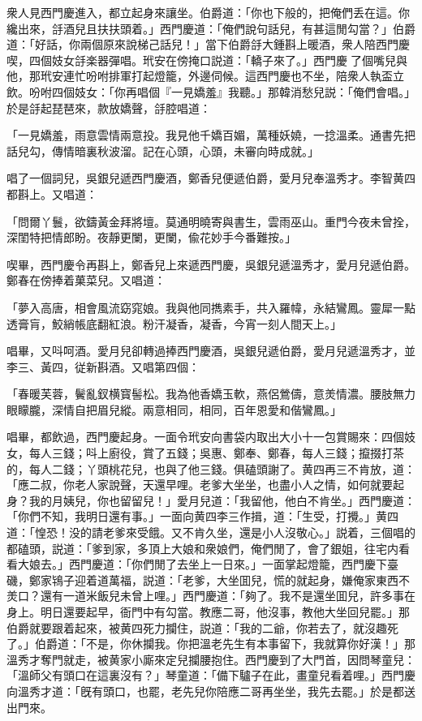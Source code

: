 衆人見西門慶進入，都立起身來讓坐。伯爵道：「你也下般的，把俺們丢在這。你纔出來，㧱酒兒且扶扶頭着。」西門慶道：「俺們說句話兒，有甚這閒勾當？」伯爵道：「好話，你兩個原來說梯己話兒！」當下伯爵㧱大鍾斟上暖酒，衆人陪西門慶喫，四個妓女㧱楽器彈唱。玳安在傍掩口説道：「轎子來了。」西門慶𢫓了個嘴兒與他，那玳安連忙吩咐排軍打起燈籠，外邊伺候。這西門慶也不坐，陪衆人執盃立飲。吩咐四個妓女：「你再唱個『一見嬌羞』我聽。」那韓消愁兒説：「俺們會唱。」於是㧱起琵琶來，款放嬌聲，㧱腔唱道：

\begin{myquote}
「一見嬌羞，雨意雲情兩意投。我見他千嬌百媚，萬種妖嬈，一捻溫柔。通書先把話兒勾，傳情暗裏秋波溜。記在心頭，心頭，未審向時成就。」
\end{myquote}

唱了一個詞兒，吳銀兒遞西門慶酒，鄭香兒便遞伯爵，愛月兒奉溫秀才。李智黄四都斟上。又唱道：

\begin{myquote}
「問爾丫鬟，欲鑄黃金拜將壇。莫通明曉寄與書生，雲雨巫山。重門今夜未曾拴，深閨特把情郎盼。夜靜更闌，更闌，偸花妙手今番難按。」
\end{myquote}

喫畢，西門慶令再斟上，鄭香兒上來遞西門慶，吳銀兒遞溫秀才，愛月兒遞伯爵。鄭春在傍捧着菓菜兒。又唱道：

\begin{myquote}
「夢入高唐，相會風流窈窕娘。我與他同擕素手，共入羅幃，永結鸞鳳。靈犀一點透膏肓，鮫綃帳底翻紅浪。粉汗凝香，凝香，今宵一刻人間天上。」
\end{myquote}

唱畢，又呌呵酒。愛月兒卻轉過捧西門慶酒，吳銀兒遞伯爵，愛月兒遞溫秀才，並李三、黃四，従新斟酒。又唱第四個：

\begin{myquote}
「春暖芙蓉，鬢亂釵横寳髻松。我為他香嬌玉軟，燕侶鶯儔，意羙情濃。腰肢無力眼矇朧，深情自把眉兒縱。兩意相同，相同，百年恩愛和偕鸞鳳。」
\end{myquote}

唱畢，都飲過，西門慶起身。一面令玳安向書袋内取出大小十一包賞賜來：四個妓女，每人三錢；呌上廚役，賞了五錢；吳惠、鄭奉、鄭春，每人三錢；攛掇打茶的，每人二錢；丫頭桃花兒，也與了他三錢。俱磕頭謝了。黄四再三不肯放，道：「應二叔，你老人家說聲，天還早哩。老爹大坐坐，也盡小人之情，如何就要起身？我的月姨兒，你也留留兒！」愛月兒道：「我留他，他白不肯坐。」西門慶道：「你們不知，我明日還有事。」一面向黄四李三作揖，道：「生受，打攪。」黄四道：「惶恐！没的請老爹來受餓。又不肯久坐，還是小人沒敬心。」説着，三個唱的都磕頭，説道：「爹到家，多頂上大娘和衆娘們，俺們閒了，會了銀姐，往宅内看看大娘去。」西門慶道：「你們閒了去坐上一日來。」一面掌起燈籠，西門慶下臺磯，鄭家鴇子迎着道萬福，説道：「老爹，大坐囬兒，慌的就起身，嫌俺家東西不羙口？還有一道米飯兒未曾上哩。」西門慶道：「夠了。我不是還坐囬兒，許多事在身上。明日還要起早，衙門中有勾當。教應二哥，他沒事，教他大坐回兒罷。」那伯爵就要跟着起來，被黄四死力攔住，説道：「我的二爺，你若去了，就沒趣死了。」伯爵道：「不是，你休攔我。你把溫老先生有本事留下，我就算你好漢！」那溫秀才奪門就走，被黄家小廝來定兒攔腰抱住。西門慶到了大門首，因問琴童兒：「溫師父有頭口在這裏沒有？」琴童道：「備下驢子在此，畫童兒看着哩。」西門慶向溫秀才道：「旣有頭口，也罷，老先兒你陪應二哥再坐坐，我先去罷。」於是都送出門來。

